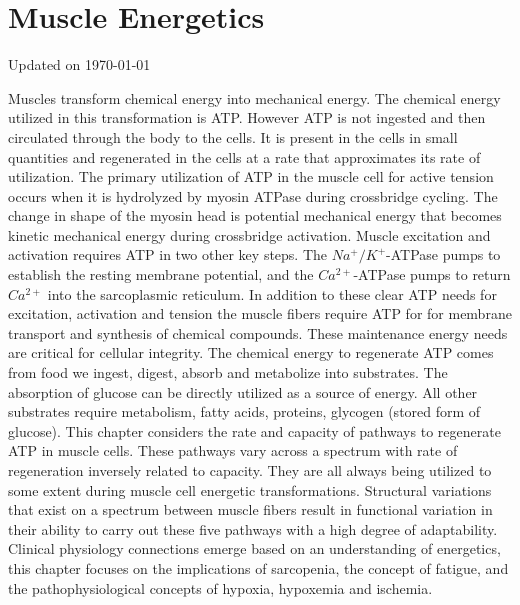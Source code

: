 \chapter{Muscle Energetics}\label{chp:energetics}
Updated on \today
\minitoc

Muscles transform chemical energy into mechanical energy. The chemical energy utilized in this transformation is ATP. However ATP is not ingested and then circulated through the body to the cells. It is present in the cells in small quantities and regenerated in the cells at a rate that approximates its rate of utilization. The primary utilization of ATP in the muscle cell for active tension occurs when it is hydrolyzed by myosin ATPase during crossbridge cycling. The change in shape of the myosin head is potential mechanical energy that becomes kinetic mechanical energy during crossbridge activation. Muscle excitation and activation requires ATP in two other key steps. The $Na^+ / K^+$-ATPase pumps to establish the resting membrane potential, and the $Ca^{2+}$-ATPase pumps to return $Ca^{2+}$ into the sarcoplasmic reticulum. In addition to these clear ATP needs for excitation, activation and tension the muscle fibers require ATP for for membrane transport and synthesis of chemical compounds. These maintenance energy needs are critical for cellular integrity. 
The chemical energy to regenerate ATP comes from food we ingest, digest, absorb and metabolize into substrates. The absorption of glucose can be directly utilized as a source of energy. All other substrates require metabolism, fatty acids, proteins, glycogen (stored form of glucose).
This chapter considers the rate and capacity of pathways to regenerate ATP in muscle cells. These pathways vary across a spectrum with rate of regeneration inversely related to capacity. They are all always being utilized to some extent during muscle cell energetic transformations. Structural variations that exist on a spectrum between muscle fibers result in functional variation in their ability to carry out these five pathways with a high degree of adaptability. Clinical physiology connections emerge based on an understanding of energetics, this chapter focuses on the implications of sarcopenia, the concept of fatigue, and the pathophysiological concepts of hypoxia, hypoxemia and ischemia.

\vspace{5mm}

